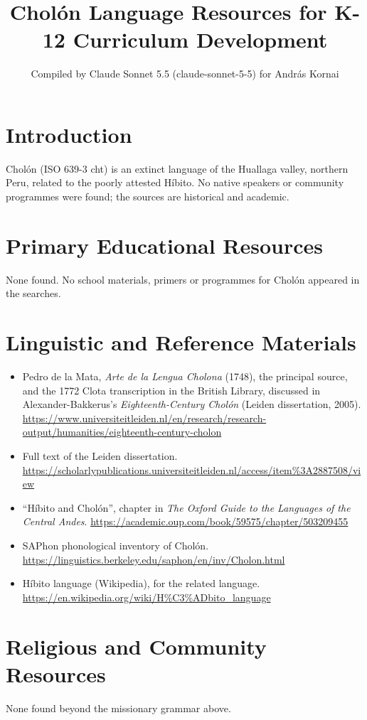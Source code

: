 \documentclass[12pt]{article}
\title{Cholón Language Resources for K-12 Curriculum Development}
\author{Compiled by Claude Sonnet 5.5 (claude-sonnet-5-5) for Andr\'as Kornai}
\date{}
\begin{document}
\maketitle

\section{Introduction}
Cholón (ISO 639-3 cht) is an extinct language of the Huallaga valley, northern Peru, related to the poorly attested Híbito. No native speakers or community programmes were found; the sources are historical and academic.

\section{Primary Educational Resources}
None found. No school materials, primers or programmes for Cholón appeared in the searches.

\section{Linguistic and Reference Materials}
\begin{itemize}
\item Pedro de la Mata, \emph{Arte de la Lengua Cholona} (1748), the principal source, and the 1772 Clota transcription in the British Library, discussed in Alexander-Bakkerus's \emph{Eighteenth-Century Cholón} (Leiden dissertation, 2005). \url{https://www.universiteitleiden.nl/en/research/research-output/humanities/eighteenth-century-cholon}
\item Full text of the Leiden dissertation. \url{https://scholarlypublications.universiteitleiden.nl/access/item%3A2887508/view}
\item ``Híbito and Cholón'', chapter in \emph{The Oxford Guide to the Languages of the Central Andes}. \url{https://academic.oup.com/book/59575/chapter/503209455}
\item SAPhon phonological inventory of Cholón. \url{https://linguistics.berkeley.edu/saphon/en/inv/Cholon.html}
\item Híbito language (Wikipedia), for the related language. \url{https://en.wikipedia.org/wiki/H%C3%ADbito_language}
\end{itemize}

\section{Religious and Community Resources}
None found beyond the missionary grammar above.
\end{document}
